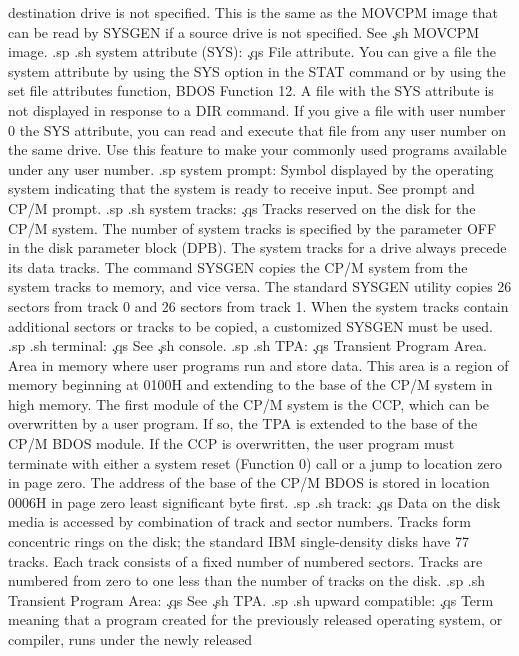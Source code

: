destination drive is not specified.  This is the same as the 
MOVCPM image that can be read by SYSGEN if a source drive is 
not specified.  See \c
.sh
MOVCPM image.
.sp
.sh
system attribute (SYS):  \c
.qs
File attribute.  You can give a file the system attribute by 
using the SYS option in the STAT command or by using the set file 
attributes function, BDOS Function 12.  A file with the SYS 
attribute is not displayed in response to a DIR command.  If you 
give a file with user number 0 the SYS attribute, you can read 
and execute that file from any user number on the same drive.  
Use this feature to make your commonly used programs available 
under any user number.
.sp
system prompt:  
Symbol displayed by the operating system indicating that the 
system is ready to receive input.  
See prompt and CP/M prompt.
.sp
.sh
system tracks:  \c
.qs
Tracks reserved on the disk for the CP/M system.  The number of 
system tracks is specified by the parameter OFF in the disk 
parameter block (DPB).  The system tracks for a drive always 
precede its data tracks.  The command SYSGEN copies the CP/M 
system from the system tracks to memory, and vice versa.  The 
standard SYSGEN utility copies 26 sectors from track 0 and 26 
sectors from track 1.  When the system tracks contain additional 
sectors or tracks to be copied, a customized SYSGEN must be used.
.sp
.sh
terminal:  \c
.qs
See \c
.sh
console.
.sp
.sh
TPA:  \c
.qs
Transient Program Area.  Area in memory where user programs run 
and store data.  This area is a region of memory beginning at 
0100H and extending to the base of the CP/M system in high 
memory.  The first module of the CP/M system is the CCP, which 
can be overwritten by a user program.  If so, the TPA is extended 
to the base of the CP/M BDOS module.  If the CCP is overwritten, 
the user program must terminate with either a system reset 
(Function 0) call or a jump to location zero in page zero.  The 
address of the base of the CP/M BDOS is stored in location 0006H 
in page zero least significant byte first.
.sp
.sh
track:  \c
.qs
Data on the disk media is accessed by combination of track and 
sector numbers.  Tracks form concentric rings on the disk; the 
standard IBM single-density disks have 77 tracks.  Each track 
consists of a fixed number of numbered sectors.  Tracks are 
numbered from zero to one less than the number of tracks on the 
disk.
.sp
.sh
Transient Program Area:  \c
.qs
See \c
.sh
TPA.
.sp
.sh
upward compatible:  \c
.qs
Term meaning that a program created for the previously released 
operating system, or compiler, runs under the newly released 
